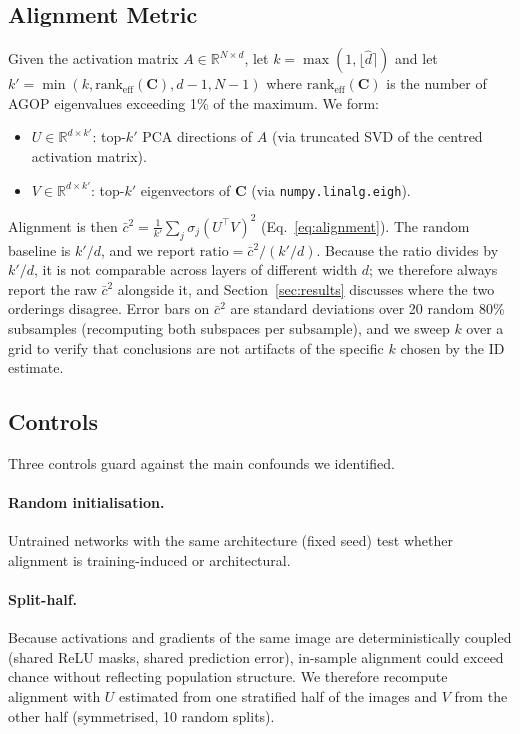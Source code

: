 \documentclass{article}
\newcommand{\R}{\mathbb{R}}
\newcommand{\AGOP}{\mathbf{C}}          %
\newcommand{\id}{\hat{d}}               %
\newcommand{\kcos}{\bar{c}^2}           %
\begin{document}
\subsection{Alignment Metric}

Given the activation matrix $A\in\R^{N\times d}$, let $k=\max(1,\lfloor\id\rceil)$
and let $k' = \min(k, \text{rank}_{\text{eff}}(\AGOP), d-1, N-1)$ where
$\text{rank}_{\text{eff}}(\AGOP)$ is the number of AGOP eigenvalues exceeding
1\% of the maximum.  We form:
\begin{itemize}
  \item $U\in\R^{d\times k'}$: top-$k'$ PCA directions of $A$ (via truncated
    SVD of the centred activation matrix).
  \item $V\in\R^{d\times k'}$: top-$k'$ eigenvectors of $\AGOP$ (via
    \texttt{numpy.linalg.eigh}).
\end{itemize}
Alignment is then $\kcos = \frac{1}{k'}\sum_j \sigma_j(U^\top V)^2$
(Eq.~\eqref{eq:alignment}).  The random baseline is $k'/d$, and we report
$\text{ratio}=\kcos/(k'/d)$.  Because the ratio divides by $k'/d$, it is not
comparable across layers of different width $d$; we therefore always report
the raw $\kcos$ alongside it, and Section~\ref{sec:results} discusses where
the two orderings disagree.  Error bars on $\kcos$ are standard deviations
over 20 random 80\% subsamples (recomputing both subspaces per subsample),
and we sweep $k$ over a grid to verify that conclusions are not artifacts of
the specific $k$ chosen by the ID estimate.

\subsection{Controls}
\label{sec:controls}

Three controls guard against the main confounds we identified.

\paragraph{Random initialisation.}  Untrained networks with the same
architecture (fixed seed) test whether alignment is training-induced or
architectural.

\paragraph{Split-half.}  Because activations and gradients of the same image
are deterministically coupled (shared ReLU masks, shared prediction error),
in-sample alignment could exceed chance without reflecting
population structure.  We therefore recompute alignment with $U$ estimated
from one stratified half of the images and $V$ from the other half
(symmetrised, 10 random splits).
\end{document}
